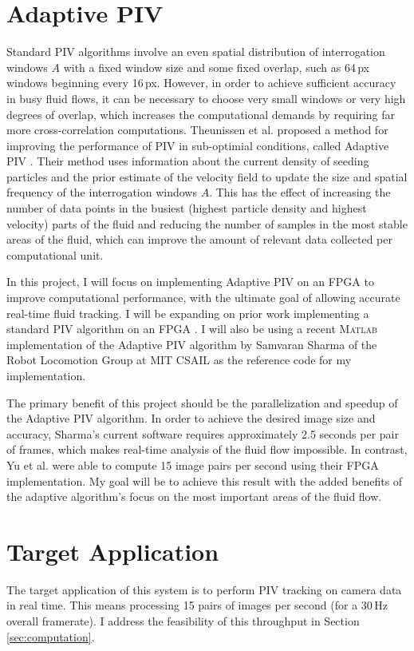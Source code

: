 \documentclass{article}
\begin{document}
	\section{Adaptive PIV} %
	\label{sec:adaptive_piv}
	Standard PIV algorithms involve an even spatial distribution of interrogation windows $A$ with a fixed window size and some fixed overlap, such as 64\,px windows beginning every 16\,px. However, in order to achieve sufficient accuracy in busy fluid flows, it can be necessary to choose very small windows or very high degrees of overlap, which increases the computational demands by requiring far more cross-correlation computations. 	Theunissen et al. proposed a method for improving the performance of PIV in sub-optimial conditions, called Adaptive PIV \citep{Theunissen:2009cr}. Their method uses information about the current density of seeding particles and the prior estimate of the velocity field to update the size and spatial frequency of the interrogation windows $A$. This has the effect of increasing the number of data points in the busiest (highest particle density and highest velocity) parts of the fluid and reducing the number of samples in the most stable areas of the fluid, which can improve the amount of relevant data collected per computational unit. 

	In this project, I will focus on implementing Adaptive PIV on an FPGA to improve computational performance, with the ultimate goal of allowing accurate real-time fluid tracking. I will be expanding on prior work implementing a standard PIV algorithm on an FPGA \citep{Yu:2006tb}. I will also be using a recent \textsc{Matlab} implementation of the Adaptive PIV algorithm by Samvaran Sharma of the Robot Locomotion Group at MIT CSAIL as the reference code for my implementation. 

	The primary benefit of this project should be the parallelization and speedup of the Adaptive PIV algorithm. In order to achieve the desired image size and accuracy, Sharma's current software requires approximately 2.5 seconds per pair of frames, which makes real-time analysis of the fluid flow impossible. In contrast, Yu et al. were able to compute 15 image pairs per second using their FPGA implementation. My goal will be to achieve this result with the added benefits of the adaptive algorithm's focus on the most important areas of the fluid flow.

	\section{Target Application}
	\label{sec:target_app}
	The target application of this system is to perform PIV tracking on camera data in real time. This means processing 15 pairs of images per second (for a 30\,Hz overall framerate). I address the feasibility of this throughput in Section \ref{sec:computation}. 
\end{document}
